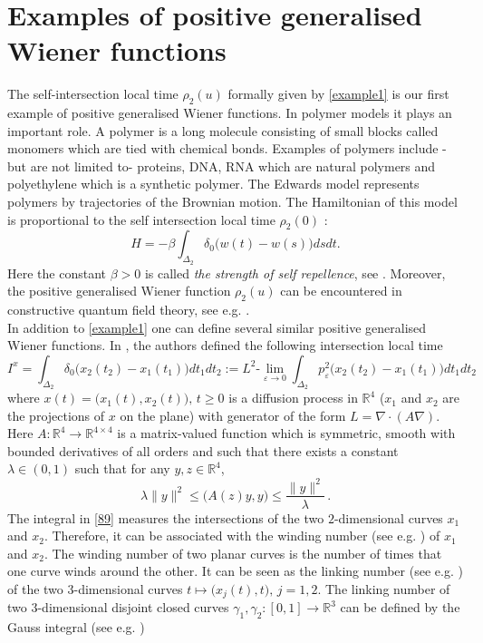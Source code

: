 \documentclass[]{interact}
\newcommand{\R}{{\mathbb{R}}}
\newcommand{\1}{\mathbf{1}}
\newcommand{\ve}{\varepsilon}
\theoremstyle{plain}%
\theoremstyle{definition}
\theoremstyle{remark}
\begin{document}
\section{Examples of positive generalised Wiener functions}
\label{sec2}

The self-intersection local time $\rho_2(u)$ formally given by \eqref{example1} is our first example of positive generalised Wiener functions. In polymer models it plays an important role. A polymer is a long molecule consisting of small blocks called monomers which are tied with chemical bonds. Examples of polymers include -but are not limited to- proteins, DNA, RNA which are natural polymers and polyethylene which is a synthetic polymer. The Edwards model represents polymers by trajectories of the Brownian motion. The Hamiltonian of this model is proportional to the self intersection local time $\rho_2(0)$ : 
$$ H=-\beta \int _{\Delta_2} \delta_0 \big(w(t)-w(s) \big)  dsdt. $$
Here the constant $\beta >0$ is called \textit{the strength of self repellence}, see \cite[Chapter 3.]{Holl09}. Moreover, the positive generalised Wiener function $\rho_2(u)$ can be encountered in constructive quantum field theory, see e.g. \cite{Sym65}.\\
In addition to \eqref{example1} one can define several similar positive generalised Wiener functions. In \cite{DI19}, the authors defined the following intersection local time 
\begin{equation} \label{89}
I^x=\int_{\Delta_2} \delta_0 \big( x_2(t_2)-x_1(t_1)\big)dt_1dt_2:=L^2\text{-} \lim_{\ve \to 0} \int_{\Delta_2} p_\ve ^2 \big( x_2(t_2)-x_1(t_1)\big)dt_1dt_2 
\end{equation} 
where $x(t)=\big( x_1(t),x_2(t)\big),\, t\geqslant 0$ is a diffusion process in $\R^4$ ($x_1$ and $x_2$ are the projections of $x$ on the plane) with generator of the form $L=\nabla \cdot (A\nabla)$. Here $A : \R^4\to \R^{4\times 4}$ is a matrix-valued function which is symmetric, smooth with bounded derivatives of all orders and such that there exists a constant $\lambda \in (0,1)$ such  that for any $y,z \in \R^4$,
$$ \lambda \|y\|^2 \leqslant \big( A(z)y,y\big) \leqslant \dfrac{\|y\|^2}{\lambda }\,. $$
The integral in \eqref{89} measures the intersections of the two $2$-dimensional curves $x_1$ and $x_2$. Therefore, it can be associated with the winding number (see e.g. \cite[Chapter 3.]{AK98}) of $x_1$ and $x_2$. The winding number of two planar curves is the number of times that one curve winds around the other. It can be seen as the linking number (see e.g. \cite[Chapter 3.]{AK98}) of the two $3$-dimensional curves $t\mapsto \big(x_j(t),t\big),\, j=1,2$. The linking number of two $3$-dimensional disjoint closed curves $\gamma_1,\gamma_2 : [0,1]\to \R^3$ can be defined by the Gauss integral (see e.g. \cite[Chapter 3.]{AK98}) 
\end{document}
